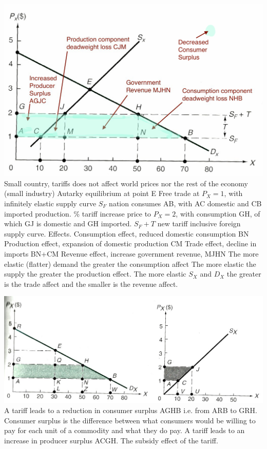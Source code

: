 \documentclass[12pt]{examnotes}
\begin{document}
\includegraphics[scale=0.4]{./imgs/81.jpg}
\ra Small country, tariffs does not affect world prices nor the rest of the economy (small industry)
\ra Autarky equilibrium at point E
\ra Free trade at $P_X=1$, with infinitely elastic supply curve $S_F$ nation consumes AB, with AC domestic and CB imported production. 
\%  tariff increase price to $P_X=2$, with consumption GH, of which GJ is domestic and GH imported. $S_F + T$ new tariff inclusive foreign supply curve.
\ra Effects.
 Consumption effect, reduced domestic consumption BN
 Production effect, expansion of domestic production CM
 Trade effect, decline in imports  BN+CM
 Revenue effect, increase government revenue, MJHN
\ra The more elastic (flatter) demand the greater the consumption affect
\ra The more elastic the supply the greater the production effect.
\ra The more elastic $S_X$ and $D_X$ the greater is the trade affect and the smaller is the revenue affect.

\includegraphics[scale=0.4]{./imgs/82.jpg}
\ra A tariff leads to a reduction in consumer surplus AGHB i.e. from ARB to GRH.
\ra Consumer surplus is the difference between what consumers would be willing to pay for each unit of a commodity and what they do pay.
\ra A tariff leads to an increase in producer surplus ACGH. The subsidy effect of the tariff.
\end{document}
